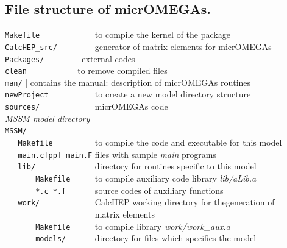 \documentclass[12pt,a4paper]{article}
\begin{document}
\subsection{File structure of micrOMEGAs.}
\label{file_structure}
\verb|Makefile            |  to compile the kernel of the package               \\
\verb|CalcHEP_src/        |        generator of matrix elements for micrOMEGAs    \\
\verb|Packages/        |        external codes    \\
\verb|clean           | to remove compiled files \\
\verb|man/|         |   contains the manual: description of micrOMEGAs routines \\
\verb|newProject          |     to create a new model directory   structure                           \\
\verb|sources/            |        micrOMEGAs code                               \\
{\it MSSM model directory}                                                          \\
\verb|MSSM/               |                                                      \\
\verb|   Makefile         |  to compile the code and executable for  this model \\
\verb|   main.c[pp] main.F|       files with sample {\it main} programs      \\
\verb|   lib/             |      directory for routines specific to this model   \\
\verb|       Makefile     |   to compile auxiliary code library {\it lib/aLib.a}    \\
\verb|       *.c *.f      |      source codes of auxiliary functions             \\
\verb|   work/            |              CalcHEP working directory for thegeneration of   \\
\verb|                    |             matrix elements                                    \\
\verb|       Makefile     |  to compile library {\it work/work\_aux.a}           \\ 
\verb|       models/      | directory for files  which specifies the model\\ 
\end{document}
